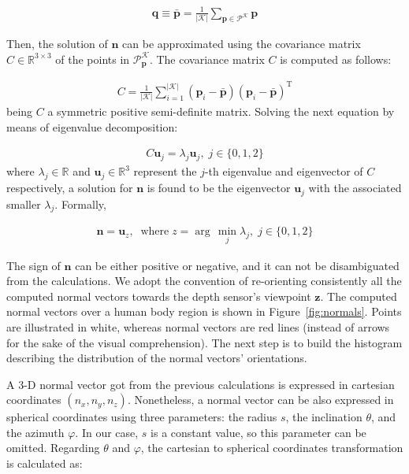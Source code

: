 \documentclass[10pt,twocolumn,letterpaper]{article}
\begin{document}
\begin{gather}
	\mathbf{q} \equiv \bar{\mathbf{p}} = \frac{1}{|\mathcal{K}|} \sum_{\mathbf{p} \in \mathcal{P}^{\mathcal{K}}} \mathbf{p}
\end{gather}
 
Then, the solution of $\mathbf{n}$ can be approximated using the covariance matrix $C \in \mathbb{R}^{3 \times 3}$ of the points in $\mathcal{P}_\mathbf{p}^{\mathcal{K}}$. The covariance matrix $C$ is computed as follows: 

\begin{gather}
	C = \frac{1}{|\mathcal{K}|} \sum_{i=1}^{|\mathcal{K}|} (\mathbf{p}_i - \bar{\mathbf{p}}) (\mathbf{p}_i - \bar{\mathbf{p}})^{\mathrm{T}}
\end{gather}
being $C$ a symmetric positive semi-definite matrix. Solving the next equation by means of eigenvalue decomposition:

\begin{gather}
	C \mathbf{u}_j = \lambda_j \mathbf{u}_j, \; j \in \{0,1,2\}
\end{gather}
where $\lambda_j \in \mathbb{R}$ and $\mathbf{u}_j \in \mathbb{R}^3$ represent the $j$-th eigenvalue and eigenvector of $C$ respectively, a solution for $\mathbf{n}$ is found to be the eigenvector $\mathbf{u}_j$ with the associated smaller $\lambda_j$. Formally,

\begin{gather}
	\mathbf{n} = \mathbf{u}_z, \;\; \mathrm{where}\;  z = \arg\,\min_{j}{\lambda_j},\; j \in \{0,1,2\}
\end{gather}

The sign of $\mathbf{n}$ can be either positive or negative, and it can not be disambiguated from the calculations. We adopt the convention of re-orienting consistently all the computed normal vectors towards the depth sensor's viewpoint $\mathbf{z}$. The computed normal vectors over a human body region is shown in Figure~\ref{fig:normals}. Points are illustrated in white, whereas normal vectors are red lines (instead of arrows for the sake of the visual comprehension). The next step is to build the histogram describing the distribution of the normal vectors' orientations.

A 3-D normal vector got from the previous calculations is expressed in cartesian coordinates $(n_x, n_y, n_z)$. Nonetheless, a normal vector can be also expressed in spherical coordinates using three parameters: the radius $s$, the inclination $\theta$, and the azimuth $\varphi$. In our case, $s$ is a constant value, so this parameter can be omitted. Regarding $\theta$ and $\varphi$, the cartesian to spherical coordinates transformation is calculated as:
\end{document}
